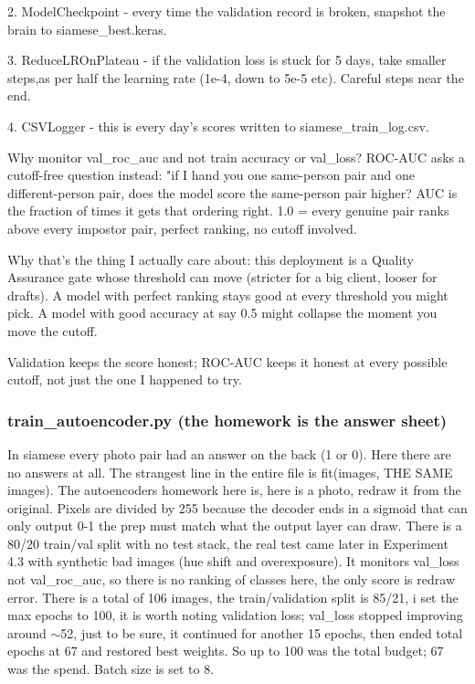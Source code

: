 \documentclass[conference]{IEEEtran}
\begin{document}
2. ModelCheckpoint - every time the validation record is broken, snapshot the brain to siamese\_best.keras.

3. ReduceLROnPlateau - if the validation loss is stuck for 5 days, take smaller steps,as per half the learning rate (1e-4, down to 5e-5 etc). Careful steps near the end.

4. CSVLogger - this is every day's scores written to siamese\_train\_log.csv.

Why monitor val\_roc\_auc and not train accuracy or val\_loss?
ROC-AUC asks a cutoff-free question instead: "if I hand you one same-person pair and one different-person pair, does the model score the same-person pair higher? AUC is the fraction of times it gets that ordering right. 1.0 = every genuine pair ranks above every impostor pair, perfect ranking, no cutoff involved.

Why that's the thing I actually care about: this deployment is a Quality Assurance gate whose threshold can move (stricter for a big client, looser for drafts). A model with perfect ranking stays good at every threshold you might pick. A model with good accuracy at say 0.5 might collapse the moment you move the cutoff.

Validation keeps the score honest; ROC-AUC keeps it honest at every possible cutoff, not just the one I happened to try.

\subsubsection{train\_autoencoder.py (the homework is the answer sheet)}
In siamese every photo pair had an answer on the back (1 or 0). Here there are no answers at all. The strangest line in the entire file is fit(images, THE SAME images). The autoencoders homework here is, here is a photo, redraw it from the original. Pixels are divided by 255 because the decoder ends in a sigmoid that can only output 0-1
the prep must match what the output layer can draw. There is a 80/20 train/val split with no test stack, the real test came later in Experiment 4.3 with synthetic bad images (hue shift and overexposure). It monitors val\_loss not val\_roc\_auc, so there is no ranking of classes here, the only score is redraw error. There is a total of 106 images, the train/validation split is 85/21, i set the max epochs to 100, it is worth noting validation loss; val\_loss stopped improving around $\sim$52, just to be sure, it continued for another 15 epochs, then ended total epochs at 67 and restored best weights. So up to 100 was the total budget; 67 was the spend. Batch size is set to 8.
\end{document}
